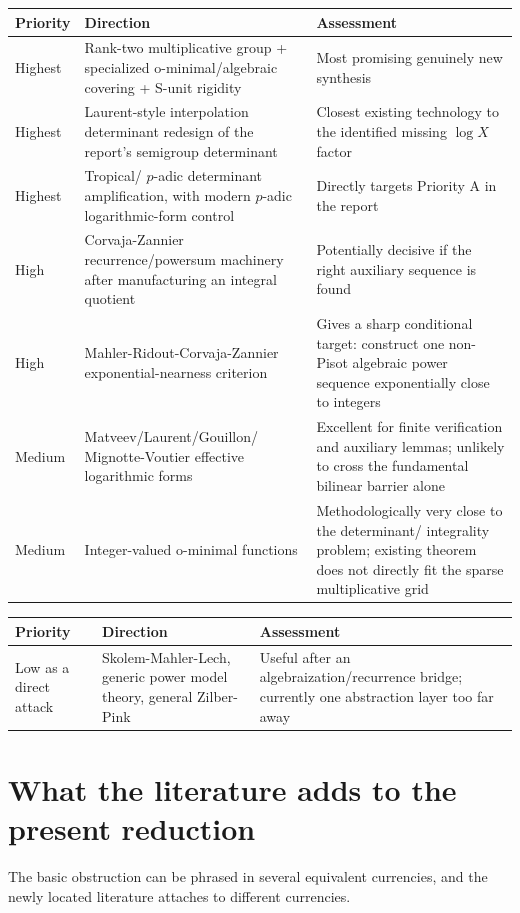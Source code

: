 \documentclass[10pt]{article}
\begin{document}
\begin{center}
\begin{tabular}[t]{|l|l|l|}
\hline
Priority & Direction & Assessment \\
\hline
Highest & Rank-two multiplicative group + specialized o-minimal/algebraic covering + S-unit rigidity & Most promising genuinely new synthesis \\
\hline
Highest & Laurent-style interpolation determinant redesign of the report's semigroup determinant & Closest existing technology to the identified missing $\log X$ factor \\
\hline
Highest & Tropical/ $p$-adic determinant amplification, with modern $p$-adic logarithmic-form control & Directly targets Priority A in the report \\
\hline
High & Corvaja-Zannier recurrence/powersum machinery after manufacturing an integral quotient & Potentially decisive if the right auxiliary sequence is found \\
\hline
High & Mahler-Ridout-Corvaja-Zannier exponential-nearness criterion & Gives a sharp conditional target: construct one non-Pisot algebraic power sequence exponentially close to integers \\
\hline
Medium & Matveev/Laurent/Gouillon/ Mignotte-Voutier effective logarithmic forms & Excellent for finite verification and auxiliary lemmas; unlikely to cross the fundamental bilinear barrier alone \\
\hline
Medium & Integer-valued o-minimal functions & Methodologically very close to the determinant/ integrality problem; existing theorem does not directly fit the sparse multiplicative grid \\
\hline
\end{tabular}
\end{center}

\begin{center}
\begin{tabular}[t]{|l|l|l|}
\hline
Priority & Direction & Assessment \\
\hline
Low as a direct attack & Skolem-Mahler-Lech, generic power model theory, general Zilber-Pink & Useful after an algebraization/recurrence bridge; currently one abstraction layer too far away \\
\hline
\end{tabular}
\end{center}

\section*{What the literature adds to the present reduction}
The basic obstruction can be phrased in several equivalent currencies, and the newly located literature attaches to different currencies.
\end{document}

